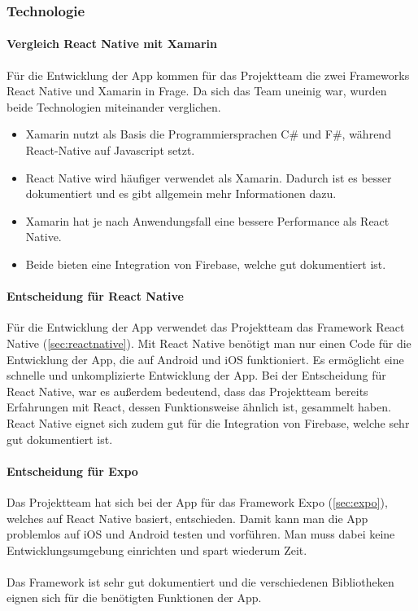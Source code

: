 \subsubsection{Technologie}
\paragraph{Vergleich React Native mit Xamarin}Für die Entwicklung der App kommen für das Projektteam die zwei Frameworks React Native und Xamarin in Frage. Da sich das Team uneinig war, wurden beide Technologien miteinander verglichen.\\

\begin{itemize}
    \item Xamarin nutzt als Basis die Programmiersprachen C\# und F\#, während React-Native auf Javascript setzt.
    \item React Native wird häufiger verwendet als Xamarin. Dadurch ist es besser dokumentiert und es gibt allgemein mehr Informationen dazu.
    \item Xamarin hat je nach Anwendungsfall eine bessere Performance als React Native.
    \item Beide bieten eine Integration von Firebase, welche gut dokumentiert ist.
\end{itemize}\cite{vergleich}

\paragraph{Entscheidung für React Native}Für die Entwicklung der App verwendet das Projektteam das Framework React Native (\ref{sec:reactnative}). Mit React Native benötigt man nur einen Code für die Entwicklung der App, die auf Android und iOS funktioniert. Es ermöglicht eine schnelle und unkomplizierte Entwicklung der App. Bei der Entscheidung für React Native, war es außerdem bedeutend, dass das Projektteam bereits Erfahrungen mit React, dessen Funktionsweise ähnlich ist, gesammelt haben. React Native eignet sich zudem gut für die Integration von Firebase, welche sehr gut dokumentiert ist.\cite{reactnative}\\

\paragraph{Entscheidung für Expo}Das Projektteam hat sich bei der App für das Framework Expo (\ref{sec:expo}), welches auf React Native basiert, entschieden. Damit kann man die App problemlos auf iOS und Android testen und vorführen. Man muss dabei keine Entwicklungsumgebung einrichten und spart wiederum Zeit.\\ \\
Das Framework ist sehr gut dokumentiert und die verschiedenen Bibliotheken eignen sich für die benötigten Funktionen der App.\\
